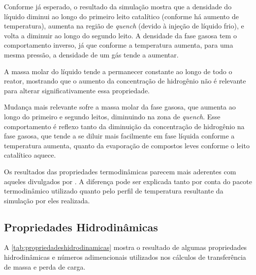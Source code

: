 Conforme já esperado, o resultado da simulação mostra que a densidade do líquido
diminui ao longo do primeiro leito catalítico (conforme há aumento de
temperatura), aumenta na região de \emph{quench} (devido à injeção de líquido
frio), e volta a diminuir ao longo do segundo leito. A densidade da fase gasosa
tem o comportamento inverso, já que conforme a temperatura aumenta, para uma
mesma pressão, a densidade de um gás tende a aumentar.

A massa molar do líquido tende a permanecer constante ao longo de todo o
reator, mostrando que o aumento da concentração de hidrogênio não é relevante
para alterar significativamente essa propriedade.

Mudança mais relevante sofre a massa molar da fase gasosa, que aumenta ao
longo do primeiro e segundo leitos, diminuindo na zona de \emph{quench}. Esse
comportamento é reflexo tanto da diminuição da concentração de hidrogênio na
fase gasosa, que tende a se diluir mais facilmente em fase líquida conforme a
temperatura aumenta, quanto da evaporação de compostos leves conforme o leito
catalítico aquece.

Os resultados das propriedades termodinâmicas parecem mais aderentes com
aqueles divulgados por . A diferença pode ser explicada
tanto por conta do pacote termodinâmico utilizado quanto pelo perfil de
temperatura resultante da simulação por eles realizada.

\subsection{Propriedades Hidrodinâmicas} \label{propriedadeshidrodinâmicas}

A \autoref{tab:propriedadeshidrodinamicas} mostra o resultado de algumas
propriedades hidrodinâmicas e números adimencionais utilizados nos cálculos de
transferência de massa e perda de carga.

